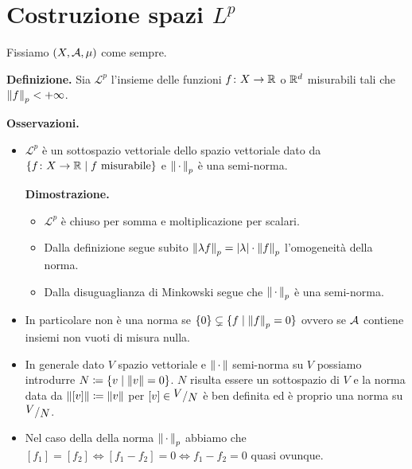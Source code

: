 %
%

\section{Costruzione spazi $L^p$}

Fissiamo $(X, \mathcal{A}, \mu)$ come sempre.

\textbf{Definizione.}
Sia $\mathscr L^p$ l'insieme delle funzioni $f \colon X \to \mathbb R$ o $\mathbb R^d$ misurabili tali che $\left\lVert f \right\rVert_p < +\infty$.

\textbf{Osservazioni.}
\begin{itemize}
	\item $\mathscr L^p$ è un sottospazio vettoriale dello spazio vettoriale dato da $\{ f \colon X \to \mathbb R \mid f \text{ misurabile} \}$ e $\left\lVert \,\cdot\, \right\rVert_p$ è una semi-norma.

		\textbf{Dimostrazione.}
		\begin{itemize}
			\item $\mathscr L^p$ è chiuso per somma e moltiplicazione per scalari.


			\item Dalla definizione segue subito $\left\lVert \lambda f \right\rVert_p = |\lambda| \cdot \left\lVert f \right\rVert_p$ l'omogeneità della norma.

			\item Dalla disuguaglianza di Minkowski segue che $\left\lVert \,\cdot\, \right\rVert_p$ è una semi-norma.
		\end{itemize}

	\item In particolare non è una norma se $\{ 0 \} \subsetneq \{ f \mid \left\lVert f \right\rVert_p = 0 \}$ ovvero se $\mathcal{A}$ contiene insiemi non vuoti di misura nulla.

	\item In generale dato $V$ spazio vettoriale e $\left\lVert \,\cdot\, \right\rVert$ semi-norma su $V$ possiamo introdurre $N \coloneqq \{ v \mid \left\lVert v \right\rVert = 0 \}$. $N$ risulta essere un sottospazio di $V$ e la norma data da $\left\lVert [v] \right\rVert \coloneqq \left\lVert v \right\rVert$ per $[v] \in \sfrac{V}{N}$ è ben definita ed è proprio una norma su $\sfrac{V}{N}$.

	\item Nel caso della della norma $\left\lVert \,\cdot\, \right\rVert_p$ abbiamo che $[f_1] = [f_2] \iff [f_1 - f_2] = 0 \iff f_1 - f_2 = 0$ quasi ovunque. 
\end{itemize}

